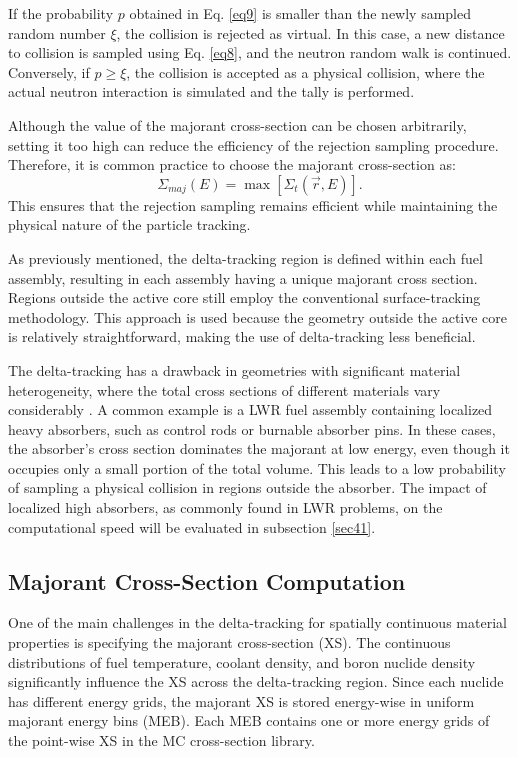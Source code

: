 If the probability $p$ obtained in Eq. \ref{eq9} is smaller than the newly sampled random number $\xi$, the collision is rejected as virtual. In this case, a new distance to collision is sampled using Eq. \ref{eq8}, and the neutron random walk is continued. Conversely, if $p \geq \xi$, the collision is accepted as a physical collision, where the actual neutron interaction is simulated and the tally is performed.

Although the value of the majorant cross-section can be chosen arbitrarily, setting it too high can reduce the efficiency of the rejection sampling procedure. Therefore, it is common practice to choose the majorant cross-section as:
\begin{equation}
    \Sigma_{maj}(E) = \max{\left[\Sigma_t(\vec{r},E)\right]}.
    \label{eq10}
\end{equation}
This ensures that the rejection sampling remains efficient while maintaining the physical nature of the particle tracking.

As previously mentioned, the delta-tracking region is defined within each fuel assembly, resulting in each assembly having a unique majorant cross section. Regions outside the active core still employ the conventional surface-tracking methodology. This approach is used because the geometry outside the active core is relatively straightforward, making the use of delta-tracking less beneficial.

The delta-tracking has a drawback in geometries with significant material heterogeneity, where the total cross sections of different materials vary considerably \cite{leppanen_2010}. A common example is a LWR fuel assembly containing localized heavy absorbers, such as control rods or burnable absorber pins. In these cases, the absorber's cross section dominates the majorant at low energy, even though it occupies only a small portion of the total volume. This leads to a low probability of sampling a physical collision in regions outside the absorber. The impact of localized high absorbers, as commonly found in LWR problems, on the computational speed will be evaluated in subsection \ref{sec41}.

\subsection{Majorant Cross-Section Computation} \label{sec24}

One of the main challenges in the delta-tracking for spatially continuous material properties is specifying the majorant cross-section (XS). The continuous distributions of fuel temperature, coolant density, and boron nuclide density significantly influence the XS across the delta-tracking region. Since each nuclide has different energy grids, the majorant XS is stored energy-wise in uniform majorant energy bins (MEB). Each MEB contains one or more energy grids of the point-wise XS in the MC cross-section library.

